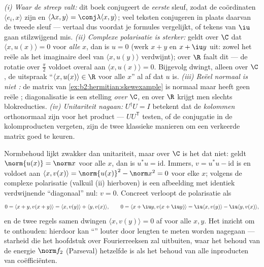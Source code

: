 \begin{remark}
\emph{(i) Waar de streep valt:} dit boek conjugeert de
\emph{eerste} sleuf, zodat de coördinaten $\langle e_i, x\rangle$
zijn en $\langle\lambda x, y\rangle = \conj\lambda\langle x,
y\rangle$; veel teksten conjugeren in plaats daarvan de tweede
sleuf --- vertaal dus voordat je formules vergelijkt, of tekens van
$\iu$ gaan stilzwijgend mis. \emph{(ii) Complexe polarisatie is
sterker:} geldt over $\C$ dat $\langle x, u(x)\rangle = 0$ voor
\emph{alle} $x$, dan is $u = 0$ (werk $x + y$ en $x + \iu y$ uit:
zowel het reële als het imaginaire deel van $\langle x,
u(y)\rangle$ verdwijnt); over $\R$ faalt dit --- de rotatie over
$\frac\pi2$ voldoet overal aan $\langle x, u(x)\rangle = 0$.
Bijgevolg dwingt, alleen over $\C$, de uitspraak ``$\langle x,
u(x)\rangle \in \R$ voor alle $x$'' al af dat $u$  is.
\emph{(iii) Reëel normaal is niet :} de matrix van
\cref{ex:b2:hermitian:skewexample} is normaal maar heeft geen reële
;  diagonalisatie is een stelling \emph{over}
$\C$, en over $\R$ krijgt men slechts blokreducties.
\emph{(iv) Unitariteit nagaan:} $U^\dagger U = I$ betekent dat de
\emph{kolommen} orthonormaal zijn voor het  product ---
$UU^{\mathsf T}$ testen, of de conjugatie in de kolomproducten
vergeten, zijn de twee klassieke manieren om een verkeerde matrix
goed te keuren.
\end{remark}

\begin{example}\label{ex:b2:hermitian:isometry}
Normbehoud lijkt zwakker dan unitariteit, maar over $\C$ is het dat
niet: geldt $\norm{u(x)} = \norm x$ voor alle $x$, dan is $u^*u =
\mathrm{id}$. Immers, $v = u^*u - \mathrm{id}$ is  en
voldoet aan $\langle x, v(x)\rangle = \norm{u(x)}^2 - \norm x^2 =
0$ voor elke $x$; volgens de complexe polarisatie (valkuil (ii)
hierboven) is een afbeelding met identiek verdwijnende
``diagonaal'' nul: $v = 0$. Concreet verloopt de polarisatie als
\[
0 = \langle x + y, v(x+y)\rangle
= \langle x, v(y)\rangle + \langle y, v(x)\rangle,
\qquad
0 = \langle x + \iu y, v(x + \iu y)\rangle
= \iu\langle x, v(y)\rangle - \iu\langle y, v(x)\rangle ,
\]
en de twee regels samen dwingen $\langle x, v(y)\rangle = 0$ af
voor alle $x, y$. Het inzicht om te onthouden: hierdoor kan
``'' louter door lengten te meten worden nagegaan ---
starheid die het hoofdstuk over Fourierreeksen zal uitbuiten, waar
het behoud van de energie $\norm f_2$ (Parseval) hetzelfde is als
het behoud van alle inproducten van coëfficiënten.
\end{example}

